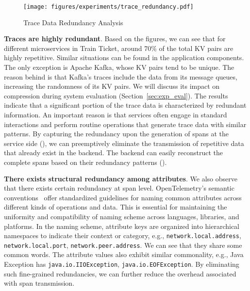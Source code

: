 
\begin{figure}
    \centering
    \texttt{[image: figures/experiments/trace\_redundancy.pdf]}
    \caption{Trace Data Redundancy Analysis}
    \label{fig:trace_redundancy}
\end{figure}

\textbf{Traces are highly redundant}.
Based on the figures, we can see that for different microservices in Train Ticket, around 70\% of the total KV pairs are highly repetitive.
Similar situations can be found in the application components.
The only exception is Apache Kafka, whose KV pairs tend to be unique.
The reason behind is that Kafka's traces include the data from its message queues, increasing the randomness of its KV pairs.
We will discuss its impact on compression during system evaluation (Section~\ref{sec:exp_eval}).
The results indicate that a significant portion of the trace data is characterized by redundant information.
An important reason is that services often engage in standard interactions and perform routine operations that generate trace data with similar patterns.
By capturing the redundancy upon the generation of spans at the service side (), we can preemptively eliminate the transmission of repetitive data that already exist in the backend.
The backend can easily reconstruct the complete spans based on their redundancy patterns ().

\textbf{There exists structural redundancy among attributes}.
We also observe that there exists certain redundancy at span level.
OpenTelemetry's semantic conventions~\cite{opentelemetry_semantic_conventions} offer standardized guidelines for naming common attributes across different kinds of operations and data.
This is essential for maintaining the uniformity and compatibility of naming scheme across languages, libraries, and platforms.
In the naming scheme, attribute keys are organized into hierarchical namespaces to indicate their context or category, e.g., \texttt{network.local.address}, \texttt{network.local.port}, \texttt{network.peer.address}.
We can see that they share some common words.
The attribute values also exhibit similar commonality, e.g., Java Exception has \texttt{java.io.IIOException}, \texttt{java.io.EOFException}.
By eliminating such fine-grained redundancies, we can further reduce the overhead associated with span transmission.

